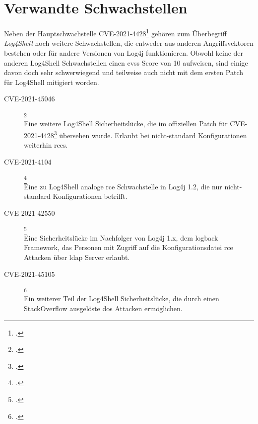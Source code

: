 
\section{Verwandte Schwachstellen}\label{sec:similarCVEs}
Neben der Hauptschwachstelle CVE-2021-4428\footcite{44228} gehören zum Überbegriff \textit{Log4Shell} noch weitere Schwachstellen, die entweder aus anderen Angriffsvektoren bestehen oder für andere Versionen von Log4j funktionieren.
Obwohl keine der anderen Log4Shell Schwachstellen einen \gls{cvss} Score von 10 aufweisen, sind einige davon doch sehr schwerwiegend und teilweise auch nicht mit dem ersten Patch für Log4Shell mitigiert worden.

\begin{description}
    \item[CVE-2021-45046]\label{itm:cve-2021-45046}\footcite{45046}\hfill \\
    Eine weitere Log4Shell Sicherheitslücke, die im offiziellen Patch für CVE-2021-4428\footcite{44228} übersehen wurde.
    Erlaubt bei nicht-standard Konfigurationen weiterhin \gls{rce}s.

    \item[CVE-2021-4104]\footcite{4104}\hfill \\
    Eine zu Log4Shell analoge \gls{rce} Schwachstelle in Log4j 1.2, die nur nicht-standard Konfigurationen betrifft.

    \item[CVE-2021-42550]\footcite{42550}\hfill \\
    Eine Sicherheitslücke im Nachfolger von Log4j 1.x, dem logback Framework, das Personen mit Zugriff auf die Konfigurationsdatei \gls{rce} Attacken über \gls{ldap} Server erlaubt.

    \item[CVE-2021-45105]\footcite{45105}\hfill \\
    Ein weiterer Teil der Log4Shell Sicherheitslücke, die durch einen StackOverflow ausgelöste \gls{dos} Attacken ermöglichen.
\end{description}
